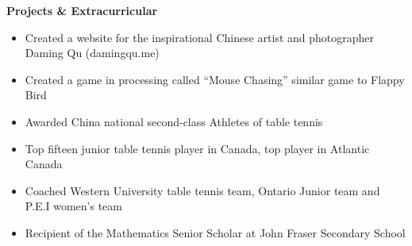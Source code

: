 \documentclass[12pt,a4paper]{article}
\begin{document}
\begin{flushleft}
\textbf{Projects \& Extracurricular}\\
\begin{itemize}
\item Created a website for the inspirational Chinese artist and photographer Daming Qu (damingqu.me)
\item Created a game in processing called “Mouse Chasing” similar game to Flappy Bird
\item Awarded China national second-class Athletes of table tennis
\item Top fifteen junior table tennis player in Canada, top player in Atlantic Canada
\item Coached Western University table tennis team, Ontario Junior team and P.E.I women’s team
\item Recipient of the Mathematics Senior Scholar at John Fraser Secondary School
\end{itemize}
\end{flushleft}


\begin{flushleft}

\end{flushleft}
\end{document}
